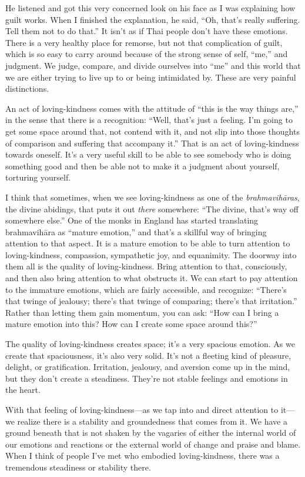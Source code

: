 He listened and got this very concerned look on his face as I was
explaining how guilt works. When I finished the explanation, he said,
“Oh, that’s really suffering. Tell them not to do that.” It isn’t as if
Thai people don’t have these emotions. There is a very healthy place for
remorse, but not that complication of guilt, which is so easy to carry
around because of the strong sense of self, “me,” and judgment. We
judge, compare, and divide ourselves into “me” and this world that we
are either trying to live up to or being intimidated by. These are very
painful distinctions.

An act of loving-kindness comes with the attitude of “this is the way
things are,” in the sense that there is a recognition: “Well, that’s
just a feeling. I’m going to get some space around that, not contend
with it, and not slip into those thoughts of comparison and suffering
that accompany it.” That is an act of loving-kindness towards oneself.
It’s a very useful skill to be able to see somebody who is doing
something good and then be able not to make it a judgment about
yourself, torturing yourself.

I think that sometimes, when we see loving-kindness as one of the
\emph{brahmavihāras}, the divine abidings, that puts it out \emph{there}
somewhere: “The divine, that’s way off somewhere else.” One of the monks
in England has started translating brahmavihāra as “mature emotion,” and
that’s a skillful way of bringing attention to that aspect. It is a
mature emotion to be able to turn attention to loving-kindness,
compassion, sympathetic joy, and equanimity. The doorway into them all
is the quality of loving-kindness. Bring attention to that, consciously,
and then also bring attention to what obstructs it. We can start to pay
attention to the immature emotions, which are fairly accessible, and
recognize: “There’s that twinge of jealousy; there’s that twinge of
comparing; there’s that irritation.” Rather than letting them gain
momentum, you can ask: “How can I bring a mature emotion into this? How
can I create some space around this?”

The quality of loving-kindness creates space; it’s a very spacious
emotion. As we create that spaciousness, it’s also very solid. It’s not
a fleeting kind of pleasure, delight, or gratification. Irritation,
jealousy, and aversion come up in the mind, but they don’t create a
steadiness. They’re not stable feelings and emotions in the heart.

With that feeling of loving-kindness—as we tap into and direct attention
to it—we realize there is a stability and groundedness that comes from
it. We have a ground beneath that is not shaken by the vagaries of
either the internal world of our emotions and reactions or the external
world of change and praise and blame. When I think of people I’ve met
who embodied loving-kindness, there was a tremendous steadiness or
stability there.

